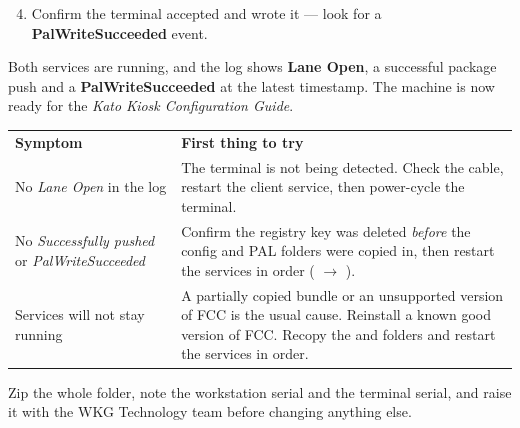 \documentclass[a4paper,10pt]{article}
\begin{document}
\begin{enumerate}\setcounter{enumi}{3}
  \item Confirm the terminal accepted and wrote it --- look for a
        \textbf{PalWriteSucceeded} event.
\end{enumerate}


\begin{wkinfo}
Both services are running, and the log shows \textbf{Lane Open}, a
successful package push and a \textbf{PalWriteSucceeded} at the latest
timestamp. The machine is now ready for the \emph{Kato Kiosk
Configuration Guide}.
\end{wkinfo}


\begin{center}
\renewcommand{\arraystretch}{1.35}\small
\begin{tabularx}{\textwidth}{L{50mm} X}
\color{white}\textbf{Symptom} &
\color{white}\textbf{First thing to try}\\
No \emph{Lane Open} in the log &
The terminal is not being detected. Check the cable, restart the client
service, then power-cycle the terminal.\\
No \emph{Successfully pushed} or \emph{PalWriteSucceeded} &
Confirm the  registry key was deleted
\emph{before} the config and PAL folders were copied in, then restart the
services in order ( $\rightarrow$ ).\\
Services will not stay running &
A partially copied bundle or an unsupported version of FCC is the usual cause. Reinstall a known good version of FCC. Recopy the 
and  folders and restart the services in order.\\
\end{tabularx}
\end{center}

\begin{wkinfo}
Zip the whole  folder, note the workstation serial and the
terminal serial, and raise it with the WKG Technology team before
changing anything else.
\end{wkinfo}
\end{document}
